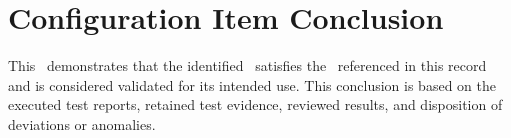\newpage
\section{Configuration Item Conclusion}
This \stdRptPkg\ demonstrates that the identified \stdCfgItem\ satisfies the
\stdIUR\ referenced in this record and is considered validated for its intended
use.  This conclusion is based on the executed test reports, retained test
evidence, reviewed results, and disposition of deviations or anomalies.
